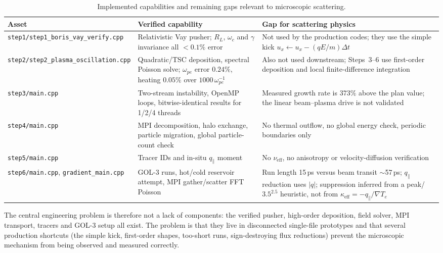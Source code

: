 \documentclass[11pt,a4paper]{article}
\begin{document}
\begin{table}[h]
\centering
\begin{tabular}{p{}p{}p{}}
\toprule
\textbf{Asset} & \textbf{Verified capability} & \textbf{Gap for scattering physics} \\
\midrule
\texttt{step1/step1\_boris\_vay\_verify.cpp} & Relativistic Vay pusher; $R_L$, $\omega_c$ and $\gamma$ invariance all $<0.1\%$ error & Not used by the production codes; they use the simple kick $u_x \leftarrow u_x - (qE/m)\Delta t$ \\
\midrule
\texttt{step2/step2\_plasma\_oscillation.cpp} & Quadratic/TSC deposition, spectral Poisson solve; $\omega_{pe}$ error $0.24\%$, heating $0.05\%$ over $1000\,\omega_{pe}^{-1}$ & Also not used downstream; Steps~3--6 use first-order deposition and local finite-difference integration \\
\midrule
\texttt{step3/main.cpp} & Two-stream instability, OpenMP loops, bitwise-identical results for 1/2/4 threads & Measured growth rate is $373\%$ above the plan value; the linear beam--plasma drive is not validated \\
\midrule
\texttt{step4/main.cpp} & MPI decomposition, halo exchange, particle migration, global particle-count check & No thermal outflow, no global energy check, periodic boundaries only \\
\midrule
\texttt{step5/main.cpp} & Tracer IDs and in-situ $q_\parallel$ moment & No $\nu_{\mathrm{eff}}$, no anisotropy or velocity-diffusion verification \\
\midrule
\texttt{step6/main.cpp}, \texttt{gradient\_main.cpp} & GOL-3 runs, hot/cold reservoir attempt, MPI gather/scatter FFT Poisson & Run length 15\,ps versus beam transit $\sim$57\,ps; $q_\parallel$ reduction uses $\lvert q\rvert$; suppression inferred from a peak/$3.5^{2.5}$ heuristic, not from $\kappa_{\mathrm{eff}}=-q_\parallel/\nabla T_e$ \\
\bottomrule
\end{tabular}
\caption{Implemented capabilities and remaining gaps relevant to microscopic scattering.}
\label{tab:state}
\end{table}

The central engineering problem is therefore not a lack of components: the verified pusher,
high-order deposition, field solver, MPI transport, tracers and GOL-3 setup all exist. The problem
is that they live in disconnected single-file prototypes and that several production shortcuts
(the simple kick, first-order shapes, too-short runs, sign-destroying flux reductions) prevent the
microscopic mechanism from being observed and measured correctly.
\end{document}
